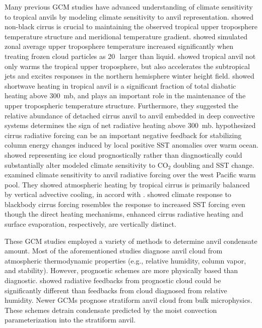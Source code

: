 \documentclass[twoside,agupp]{aguplus}
\begin{document}
Many previous GCM studies have advanced understanding of climate
sensitivity to tropical anvils by modeling climate sensitivity to
anvil representation.
\cite{RPM83} showed non-black cirrus is crucial to maintaining
the observed tropical upper troposphere temperature structure and  
meridional temperature gradient.
\cite{ChR85} showed simulated zonal average upper troposphere
temperature increased significantly when treating frozen cloud 
particles as 20\,\um\ larger than liquid.
\cite{SlS88} showed tropical anvil not only warms the tropical upper  
troposphere, but also accelerates the subtropical jets and excites
responses in the northern hemisphere winter height field. 
\cite{RaR891} showed shortwave heating in tropical anvil is a
significant fraction of total diabatic heating above 300~mb, and plays
an important role in the maintenance of the upper tropospheric
temperature structure. 
Furthermore, they suggested the relative abundance of detached cirrus 
anvil to anvil embedded in deep convective systems determines the sign
of net radiative heating above 300~mb.
\cite{RaC91} hypothesized cirrus radiative forcing can be an important
negative feedback for stabilizing column energy changes induced by
local positive SST anomalies over warm ocean.
\cite{SeM93} showed representing ice cloud prognostically rather than
diagnostically could substantially alter modeled climate sensitivity
to CO$_2$ doubling and SST change. 
\cite{SRB94} examined climate sensitivity to anvil radiative forcing
over the west Pacific warm pool.
They showed atmospheric heating by tropical cirrus is primarily
balanced by vertical advective cooling, in accord with \cite{ALV88}.
\cite{LoR95} showed climate response to blackbody cirrus forcing
resembles the response to increased SST forcing even though the direct
heating mechanisms, enhanced cirrus radiative heating and surface
evaporation, respectively, are vertically distinct.

These GCM studies employed a variety of methods to determine anvil
condensate amount. 
Most of the aforementioned studies diagnose anvil cloud from
atmospheric thermodynamic properties (e.g., relative humidity, column
vapor, and stability).
However, prognostic schemes are more physically based than diagnostic.
\cite{SeM93} showed radiative feedbacks from prognostic cloud could be
significantly different than feedbacks from cloud diagnosed from
relative humidity. 
Newer GCMs \cite[e.g.,][]{Tie93,DYK96} prognose stratiform
anvil cloud from bulk microphysics.
These schemes detrain condensate predicted by the moist convection
parameterization into the stratiform anvil.
\end{document}
